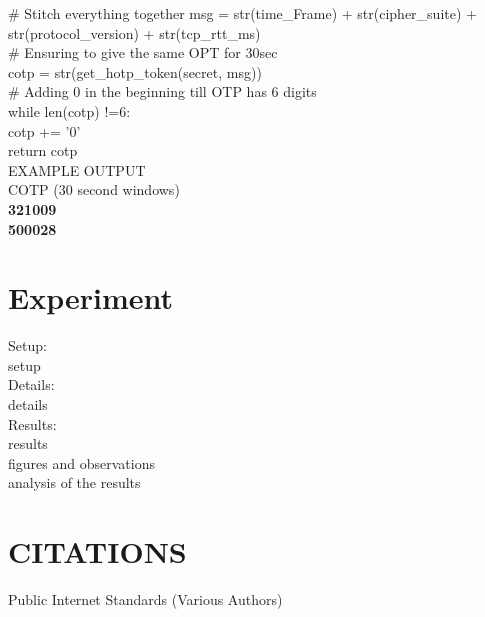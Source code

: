 \documentclass[a4paper, 11pt]{article} 				%
\begin{document}
\# Stitch everything together
msg = str(time\_Frame) + str(cipher\_suite) \indent + str(protocol\_version) + str(tcp\_rtt\_ms)\\

\# Ensuring to give the same OPT for 30sec\\
\indent cotp = str(get\_hotp\_token(secret, msg))\\

\# Adding 0 in the beginning till OTP has 6 digits\\
\indent while len(cotp) !=6:\\
 \indent \indent cotp += '0'\\

\indent \indent return cotp\\

\noindent
EXAMPLE OUTPUT\\
 \noindent
 COTP (30 second windows)\\
 \textbf{321009}\\
 \textbf{500028}\\ 



\section{Experiment}				%
\noindent
Setup:\\
setup\\

\noindent
Details:\\
details\\

\noindent
Results:\\
results\\
figures and observations\\
analysis of the results\\



\section{CITATIONS } 	%
\noindent
Public Internet Standards (Various Authors)
\end{document}
